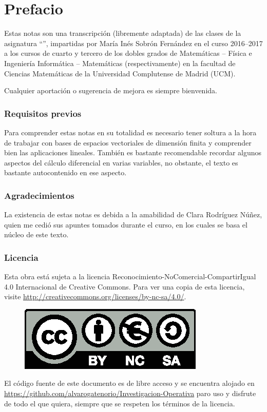 \chapter*{Prefacio}
Estas notas son una transcripción (libremente adaptada) de las clases de la asignatura ``'', impartidas por María Inés Sobrón Fernández en el curso 2016--2017 a los cursos de cuarto y tercero de los dobles grados de  Matemáticas -- Física e Ingeniería Informática -- Matemáticas (respectivamente) en la facultad de Ciencias Matemáticas de la Universidad Complutense de Madrid (UCM).

Cualquier aportación o sugerencia de mejora es siempre bienvenida.
\subsection*{Requisitos previos}
Para comprender estas notas en su totalidad es necesario tener soltura a la hora de trabajar con bases de espacios vectoriales de dimensión finita y comprender bien las aplicaciones lineales. También es bastante recomendable recordar algunos aspectos del cálculo diferencial en varias variables, no obstante, el texto es bastante autocontenido en ese aspecto.
\subsection*{Agradecimientos}
La existencia de estas notas es debida a la amabilidad de Clara Rodríguez Núñez, quien me cedió sus apuntes tomados durante el curso, en los cuales se basa el núcleo de este texto.
\subsection*{Licencia}
Esta obra está sujeta a la licencia Reconocimiento-NoComercial-CompartirIgual 4.0 Internacional de Creative Commons. Para ver una copia de esta licencia, visite \url{http://creativecommons.org/licenses/by-nc-sa/4.0/}.
\begin{figure}[h]
	\centering
	\includegraphics[scale=1]{img/licencia}
\end{figure}

El código fuente de este documento es de libre acceso y se encuentra alojado en \url{https://github.com/alvarogatenorio/Investigacion-Operativa} paro uso y disfrute de todo el que quiera, siempre que se respeten los términos de la licencia.